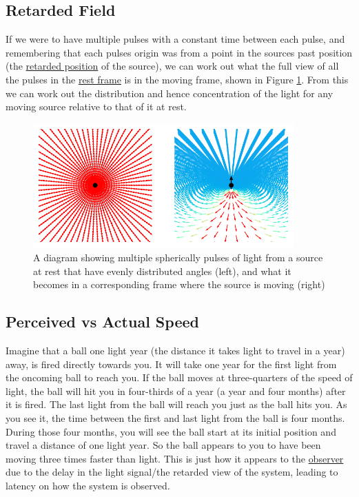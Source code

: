 \subsection{Retarded Field}

If we were to have multiple pulses with a constant time between each pulse, and remembering that each pulses origin was from a point in the sources past position (the \hyperlink{def-retarded-position}{retarded position}  of the source), we can work out what the full view of all the pulses in the \hyperlink{def-proper-frame}{rest frame} is in the moving frame, shown in Figure \ref{fig: full field transformation 1}. From this we can work out the distribution and hence concentration of the light for any moving source relative to that of it at rest.

\begin{figure}[ht]
	\centering
	\includegraphics[width=10cm]{images/pdf/Still_Retarded_Field_Both_Frames.pdf}
	\caption{ A diagram showing multiple spherically pulses of light from a source at rest that have evenly distributed angles (left), and what it becomes in a corresponding frame where the source is moving (right)}
	\label{fig: full field transformation 1}
\end{figure}

\subsection{Perceived vs Actual Speed}

Imagine that a ball one light year (the distance it takes light to travel in a year) away, is fired directly towards you. It will take one year for the first light from the oncoming ball to reach you. If the ball moves at three-quarters of the speed of light, the ball will hit you in four-thirds of a year (a year and four months) after it is fired. The last light from the ball will reach you just as the ball hits you. As you see it, the time between the first and last light from the ball is four months. During those four months, you will see the ball start at its initial position and travel a distance of one light year. So the ball appears to you to have been moving three times faster than light. This is just how it appears to the \hyperlink{def-observer}{observer} due to the delay in the light signal/the retarded view of the system, leading to latency on how the system is observed.

